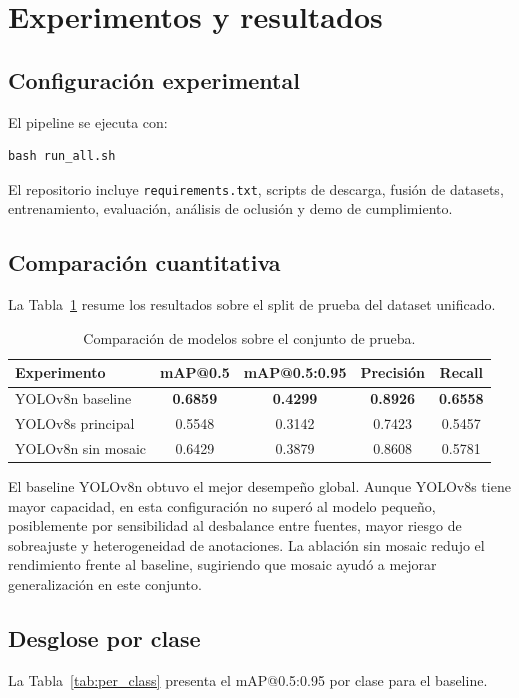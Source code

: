 \documentclass{article}
\begin{document}
\section{Experimentos y resultados}
\subsection{Configuración experimental}
El pipeline se ejecuta con:
\begin{verbatim}
bash run_all.sh
\end{verbatim}
El repositorio incluye \texttt{requirements.txt}, scripts de descarga, fusión de datasets, entrenamiento, evaluación, análisis de oclusión y demo de cumplimiento.

\subsection{Comparación cuantitativa}
La Tabla~\ref{tab:main_results} resume los resultados sobre el split de prueba del dataset unificado.

\begin{table}[H]
\centering
\caption{Comparación de modelos sobre el conjunto de prueba.}
\label{tab:main_results}
\small
\begin{tabular}{lcccc}
\toprule
\textbf{Experimento} & \textbf{mAP@0.5} & \textbf{mAP@0.5:0.95} & \textbf{Precisión} & \textbf{Recall} \\
\midrule
YOLOv8n baseline & \textbf{0.6859} & \textbf{0.4299} & \textbf{0.8926} & \textbf{0.6558} \\
YOLOv8s principal & 0.5548 & 0.3142 & 0.7423 & 0.5457 \\
YOLOv8n sin mosaic & 0.6429 & 0.3879 & 0.8608 & 0.5781 \\
\bottomrule
\end{tabular}
\end{table}

El baseline YOLOv8n obtuvo el mejor desempeño global. Aunque YOLOv8s tiene mayor capacidad, en esta configuración no superó al modelo pequeño, posiblemente por sensibilidad al desbalance entre fuentes, mayor riesgo de sobreajuste y heterogeneidad de anotaciones. La ablación sin mosaic redujo el rendimiento frente al baseline, sugiriendo que mosaic ayudó a mejorar generalización en este conjunto.

\subsection{Desglose por clase}
La Tabla~\ref{tab:per_class} presenta el mAP@0.5:0.95 por clase para el baseline.
\end{document}
